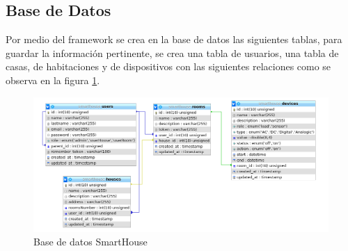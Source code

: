 \subsection{Base de Datos}

Por medio del framework se crea en la base de datos las siguientes tablas, para guardar la información pertinente, se crea una tabla de usuarios, una tabla de casas, de habitaciones y de dispositivos con las siguientes relaciones como se observa en la figura \ref{fig:db}.\\

\begin{figure}
	\centering
	\caption{Base de datos SmartHouse}
	\label{fig:db}
	\includegraphics[width=0.7\linewidth]{Imagenes/DB}
\end{figure}

